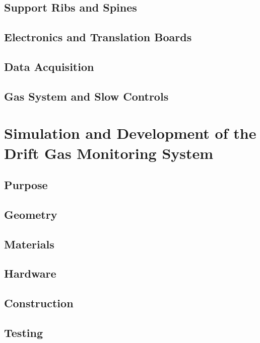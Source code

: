 \subsection{Support Ribs and Spines}
\subsection{Electronics and Translation Boards}
\subsection{Data Acquisition}
\subsection{Gas System and Slow Controls}

\section{Simulation and Development of the Drift Gas Monitoring System}
\subsection{Purpose}
\subsection{Geometry}
\subsection{Materials}
\subsection{Hardware}
\subsection{Construction}
\subsection{Testing}



